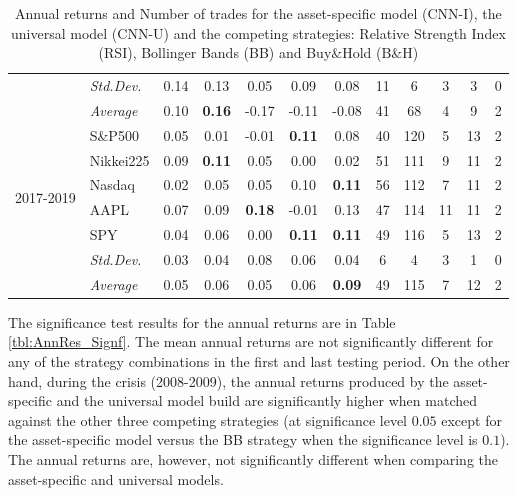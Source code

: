 \documentclass[12pt, a4paper]{article}
\begin{document}
\begin{table}[H]
\begin{tabular}{l|l|ccccc|ccccc}
 & \textit{Std.Dev.} & 0.14 & 0.13 & 0.05  & 0.09  & 0.08  & 11 & 6  & 3 & 3  & 0 \\ \cline{2-12} 
 & \textit{Average}  & 0.10 & \textbf{0.16} & -0.17 & -0.11 & -0.08 & 41 & 68 & 4 & 9  & 2 \\ \hline
\multirow{6}{1cm}{2017-2019} & S\&P500       & 0.05          & 0.01          & -0.01         & \textbf{0.11} & 0.08          & 40               & 120   & 5   & 13 & 2    \\
  & Nikkei225     & 0.09          & \textbf{0.11} & 0.05          & 0.00          & 0.02          & 51               & 111   & 9   & 11 & 2    \\
  & Nasdaq         & 0.02          & 0.05          & 0.05          & 0.10          & \textbf{0.11} & 56               & 112   & 7   & 11 & 2    \\
  & AAPL      & 0.07          & 0.09          & \textbf{0.18} & -0.01         & 0.13          & 47               & 114   & 11  & 11 & 2    \\
  & SPY       & 0.04          & 0.06          & 0.00          & \textbf{0.11} & \textbf{0.11} & 49               & 116   & 5   & 13 & 2    \\ 
  \cline{2-12}
  & \textit{Std.Dev.}  & 0.03 & 0.04 & 0.08 & 0.06 & 0.04 & 6 & 4 & 3 & 1 & 0\\
  \cline{2-12}
  & \textit{Average} & 0.05          & 0.06          & 0.05          & 0.06          & \textbf{0.09} & 49               & 115   & 7   & 12 & 2   
\end{tabular}
\caption{Annual returns and Number of trades for the asset-specific model (CNN-I), the universal model (CNN-U) and the competing strategies: Relative Strength Index (RSI), Bollinger Bands (BB) and Buy\&Hold (B\&H)}
\label{tbl:FinResMain}
\end{table}

The significance test results for the annual returns are in Table \ref{tbl:AnnRes_Signf}. The mean annual returns are not significantly different for any of the strategy combinations in the first and last testing period. On the other hand, during the crisis (2008-2009), the annual returns produced by the asset-specific and the universal model build are significantly higher when matched against the other three competing strategies (at significance level $0.05$ except for the asset-specific model versus the BB strategy when the significance level is $0.1$). The annual returns are, however, not significantly different when comparing the asset-specific and universal models.
\end{document}
